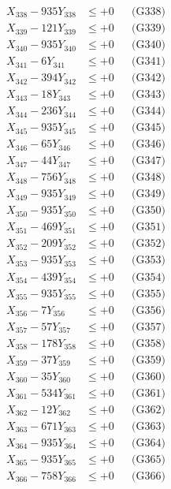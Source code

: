 \documentclass[a4paper,10pt]{article}
\begin{document}
{\begin{align}
X_{338} - 935Y_{338} &\leq +0 && \text{(G338)} \\
X_{339} - 121Y_{339} &\leq +0 && \text{(G339)} \\
X_{340} - 935Y_{340} &\leq +0 && \text{(G340)} \\
\allowbreak
X_{341} - 6Y_{341} &\leq +0 && \text{(G341)} \\
X_{342} - 394Y_{342} &\leq +0 && \text{(G342)} \\
X_{343} - 18Y_{343} &\leq +0 && \text{(G343)} \\
X_{344} - 236Y_{344} &\leq +0 && \text{(G344)} \\
X_{345} - 935Y_{345} &\leq +0 && \text{(G345)} \\
X_{346} - 65Y_{346} &\leq +0 && \text{(G346)} \\
X_{347} - 44Y_{347} &\leq +0 && \text{(G347)} \\
X_{348} - 756Y_{348} &\leq +0 && \text{(G348)} \\
X_{349} - 935Y_{349} &\leq +0 && \text{(G349)} \\
X_{350} - 935Y_{350} &\leq +0 && \text{(G350)} \\
\allowbreak
X_{351} - 469Y_{351} &\leq +0 && \text{(G351)} \\
X_{352} - 209Y_{352} &\leq +0 && \text{(G352)} \\
X_{353} - 935Y_{353} &\leq +0 && \text{(G353)} \\
X_{354} - 439Y_{354} &\leq +0 && \text{(G354)} \\
X_{355} - 935Y_{355} &\leq +0 && \text{(G355)} \\
X_{356} - 7Y_{356} &\leq +0 && \text{(G356)} \\
X_{357} - 57Y_{357} &\leq +0 && \text{(G357)} \\
X_{358} - 178Y_{358} &\leq +0 && \text{(G358)} \\
X_{359} - 37Y_{359} &\leq +0 && \text{(G359)} \\
X_{360} - 35Y_{360} &\leq +0 && \text{(G360)} \\
\allowbreak
X_{361} - 534Y_{361} &\leq +0 && \text{(G361)} \\
X_{362} - 12Y_{362} &\leq +0 && \text{(G362)} \\
X_{363} - 671Y_{363} &\leq +0 && \text{(G363)} \\
X_{364} - 935Y_{364} &\leq +0 && \text{(G364)} \\
X_{365} - 935Y_{365} &\leq +0 && \text{(G365)} \\
X_{366} - 758Y_{366} &\leq +0 && \text{(G366)} \\

\end{align}}
\end{document}
